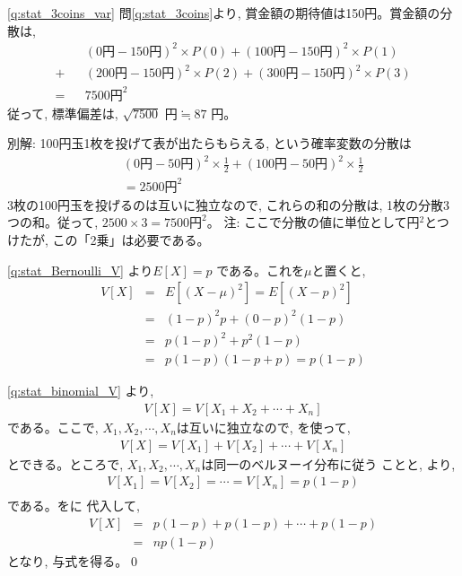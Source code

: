 %
\ref{q:stat_3coins_var}  問\ref{q:stat_3coins}より, 賞金額の期待値は150円。賞金額の分散は, 
\begin{eqnarray*}
&&(0\text{円}-150\text{円})^2\times P(0)+(100\text{円}-150\text{円})^2\times P(1)\\
+&&(200\text{円}-150\text{円})^2\times P(2)+(300\text{円}-150\text{円})^2\times P(3)\\
=&&7500\text{円}^2
\end{eqnarray*}
従って, 標準偏差は, $\sqrt{7500}\text{ 円}\fallingdotseq87\text{ 円}$。

別解: 100円玉1枚を投げて表が出たらもらえる, という確率変数の分散は
\begin{eqnarray*}
&&(0\text{円}-50\text{円})^2\times\frac{1}{2}+(100\text{円}-50\text{円})^2\times\frac{1}{2}\\
&&=2500\text{円}^2
\end{eqnarray*}
3枚の100円玉を投げるのは互いに独立なので, これらの和の分散は, 1枚の分散3つの和。従って, $2500\times3=7500\text{円}^2$。
注: ここで分散の値に単位として円$^2$とつけたが, この「2乗」は必要である。
\mv

\ref{q:stat_Bernoulli_V} より$E[X]=p$
である。これを$\mu$と置くと, 
\begin{eqnarray*}
V[X]&=&E[(X-\mu)^2]=E[(X-p)^2]\nonumber\\
    &=&(1-p)^2p+(0-p)^2(1-p)\nonumber\\
    &=&p(1-p)^2+p^2(1-p)\nonumber\\
    &=&p(1-p)(1-p+p)=p(1-p)
\end{eqnarray*}
\mv

\ref{q:stat_binomial_V} 
より, 
\begin{eqnarray}
V[X]=V[X_1+X_2+\cdots+X_n]\label{eq:stat_binomial_V_ans2}
\end{eqnarray}
である。ここで, $X_1, X_2, \cdots, X_n$は互いに独立なので, 
を使って, 
\begin{eqnarray}
V[X]=V[X_1]+V[X_2]+\cdots+V[X_n]\label{eq:stat_binomial_V_ans4}
\end{eqnarray}
とできる。ところで, $X_1, X_2, \cdots, X_n$は同一のベルヌーイ分布に従う
ことと, より, 
\begin{eqnarray}
V[X_1]=V[X_2]=\cdots=V[X_n]=p(1-p)\nonumber\\\label{eq:stat_binomial_V_ans6}
\end{eqnarray}
である。をに
代入して, 
\begin{eqnarray*}
V[X]&=&p(1-p)+p(1-p)+\cdots+p(1-p)\\
    &=&np(1-p)
\end{eqnarray*}
となり, 与式を得る。\qed
\mv

